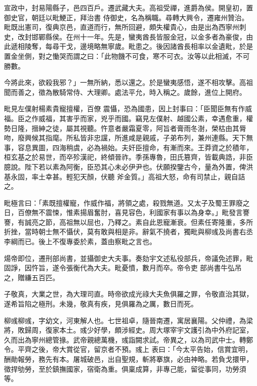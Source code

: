 \begin{pinyinscope}
 宣政中，封易陽縣子，邑四百戶。遷武藏大夫。高祖受禪，進爵為侯。開皇初，置御史官，朝廷以毗鯁正，拜治書
 侍御史，名為稱職。尋轉大興令，遷雍州贊治。毗既出憲司，復典京邑，直道而行，無所回避，頗失權貴心，由是出為西寧州刺史，改封邯鄲縣侯。在州十一年。先是，蠻夷酋長皆服金冠，以金多者為豪俊，由此遞相陵奪，每尋干戈，邊境略無寧歲。毗患之。後因諸酋長相率以金遺毗，於是置金坐側，對之慟哭而謂之曰：「此物饑不可食，寒不可衣。汝等以此相滅，不可勝數。



 今將此來，欲殺我邪？」一無所納，悉以還之。於是蠻夷感悟，遂不相攻擊。高祖聞而善之，徵為散騎常侍、大理卿。處法平允，時入稱之。歲餘，進位上開府。



 毗見左僕射楊素貴寵擅權，百僚
 震懾，恐為國患，因上封事曰：「臣聞臣無有作威福。臣之作威福，其害乎而家，兇乎而國。竊見左僕射、越國公素，幸遇愈重，權勢日隆，搢紳之徒，屬其視聽。忤意者嚴霜夏零，阿旨者膏雨冬澍，榮枯由其脣吻，廢興候其指麾。所私皆非忠讜，所進咸是親戚，子弟布列，兼州連縣。天下無事，容息異圖，四海稍虞，必為禍始。夫奸臣擅命，有漸而來。王莽資之於積年，桓玄基之於易世，而卒殄漢祀，終傾晉祚。季孫專魯，田氏篡齊，皆載典誥，非臣臆說。陛下若以素為阿衡，臣恐其心未必伊尹也。伏願揆鑒古今，量為外置，俾洪基永固，率土幸甚。輕犯天顏，伏聽
 斧金質。」高祖大怒，命有司禁止，親自詰之。



 毗極言曰：「素既擅權寵，作威作福，將領之處，殺戮無道。又太子及蜀王罪廢之日，百僚無不震悚，惟素揚眉奮肘，喜見容色，利國家有事以為身幸。」毗發言謇謇，有誠亮之節，高祖無以屈也，乃釋之。素自此恩寵漸衰。但素任寄隆重，多所折挫，當時朝士無不懾伏，莫有敢與相是非。辭氣不撓者，獨毗與柳彧及尚書右丞李綱而已。後上不復專委於素，蓋由察毗之言也。



 煬帝即位，遷刑部尚書，並攝御史大夫事。奏劾宇文述私役部兵，帝議免述罪，毗固諍，因忤旨，遂令張衡代為大夫。毗憂憤，數月而卒。帝令吏
 部尚書牛弘吊之，贈縑五百匹。



 子敬真，大業之世，為大理司直。時帝欲成光祿大夫魚俱羅之罪，令敬直治其獄，遂希旨陷之極刑。未幾，敬真有疾，見俱羅為之厲，數日而死。



 柳彧柳彧，字幼文，河東解人也。七世祖卓，隨晉南遷，寓居襄陽。父仲禮，為梁將，敗歸周，復家本土。彧少好學，頗涉經史。周大塚宰宇文護引為中外府記室，久而出為寧州總管掾。武帝親總萬機，彧詣闕求試。帝異之，以為司武中士。轉鄭令。平齊之後，帝大賞從官，留京者不預。彧上
 表曰：「今太平告始，信賞宜明，酬勛報勞，務先有本。屠城破邑，出自聖規，斬將搴旗，必由神略。若負戈擐甲，徵捍劬勞，至於鎮撫國家，宿衛為重。俱稟成算，非專己能，留從事同，功勞須等。




\end{pinyinscope}
